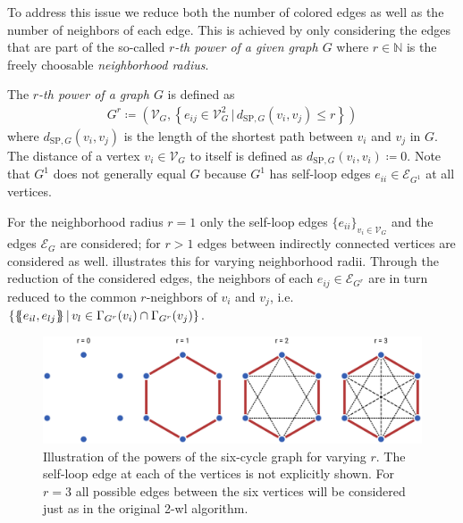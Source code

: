 \begin{enumerate}[label=\textbf{\arabic*.}]
		To address this issue we reduce both the number of colored edges as well as the number of neighbors of each edge.
		This is achieved by only considering the edges that are part of the so-called \textit{$r$-th power of a given graph $G$} where $r \in \mathbb{N}$ is the freely choosable \textit{neighborhood radius}.
		\begin{defn}
			The \textit{$r$-th power of a graph $G$} is defined as
			\begin{align*}
				G^r \coloneqq \left(\mathcal{V}_G, \left\{ e_{ij} \in \mathcal{V}_G^2\, |\, d_{\mathrm{SP}, G}(v_i, v_j) \leq r \right\}\right) %
			\end{align*}
			where $d_{\mathrm{SP}, G}(v_i, v_j)$ is the length of the shortest path between $v_i$ and $v_j$ in $G$.
			The distance of a vertex $v_i \in \mathcal{V}_G$ to itself is defined as $d_{\mathrm{SP}, G}(v_i, v_i) \coloneqq 0$.
			Note that $G^1$ does not generally equal $G$ because $G^1$ has self-loop edges $e_{ii} \in \mathcal{E}_{G^1}$ at all vertices.
		\end{defn}
		For the neighborhood radius $r = 1$ only the self-loop edges ${\{ e_{ii} \}}_{v_i \in \mathcal{V}_G}$ and the edges $\mathcal{E}_{G}$ are considered;
		for $r > 1$ edges between indirectly connected vertices are considered as well.
		 illustrates this for varying neighborhood radii.
		Through the reduction of the considered edges, the neighbors of each $e_{ij} \in \mathcal{E}_{G^r}$ are in turn reduced to the common $r$-neighbors of $v_i$ and $v_j$, i.e.\ $\{ \ldblbrace e_{il}, e_{lj} \rdblbrace\, |\, v_l \in {\Gamma_{G^r}(v_i) \cap \Gamma_{G^r}(v_j)} \}$. %
		\begin{figure}[t]
			\centering
			\includegraphics[width=0.9\linewidth]{gfx/ltd/neighborhood-radius.pdf}
			\caption[Illustration of the powers of the six-cycle graph.]{
				Illustration of the powers of the six-cycle graph for varying $r$.
				The self-loop edge at each of the vertices is not explicitly shown.
				For $r = 3$ all possible edges between the six vertices will be considered just as in the original 2-\acs{wl} algorithm.
			}\label{fig:ltd:neighborhood-radius}
		\end{figure}


\end{enumerate}
